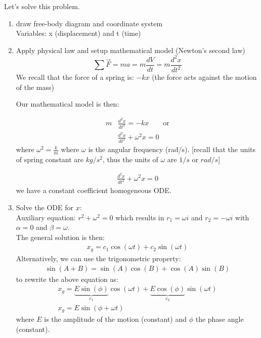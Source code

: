 Let's solve this problem.\\
\begin{enumerate}
\item draw free-body diagram and coordinate system\\
Variables: x (displacement) and t (time)
\item Apply physical law and setup mathematical model (Newton's second law)
\begin{equation}
\sum \vec{F}=ma=m\frac{dV}{dt}=m\frac{d^2x}{dt^2}
\end{equation}
We recall that the force of a spring is: $-kx$ (the force acts against the motion of the mass)

Our mathematical model is then:

\begin{align*}
m&\frac{d^2x}{dt^2} = -kx \qquad \text{or}\\
&\frac{d^2x}{dt^2} + \omega^2 x=0
\end{align*}
where $\omega^2=\frac{k}{m}$ where $\omega$ is the angular frequency (rad/s). [recall that the units of spring constant are $kg/s^2$, thus the units of $\omega$ are $1/s$ or $rad/s$]

\begin{align*}
\boxed{\frac{d^2x}{dt^2} + \omega^2 x=0}
\end{align*}
we have a constant coefficient homogeneous ODE.
\item Solve the ODE for $x$:\\
Auxiliary equation: $r^2+\omega^2=0$ which results in $r_1=\omega i$ and $r_2=-\omega i$ with $\alpha=0$ and $\beta=\omega$.\\
The general solution is then:
\begin{align*}
\boxed{x_g=c_1 \cos(\omega t)+c_2 \sin(\omega t)}
\end{align*}
Alternatively, we can use the trigonometric property:
\begin{align*}
\sin(A + B)=\sin(A)\cos(B)+\cos(A)\sin(B)
\end{align*}
to rewrite the above equation as:
\begin{align*}
x_g=\underbrace{E\sin(\phi)}_{c_1} \cos(\omega t)+\underbrace{E\cos(\phi)}_{c_2} \sin(\omega t)\\
x_g=E\sin(\phi+\omega t)
\end{align*}
where $E$ is the amplitude of the motion (constant) and $\phi$ the phase angle (constant).


\end{enumerate}
